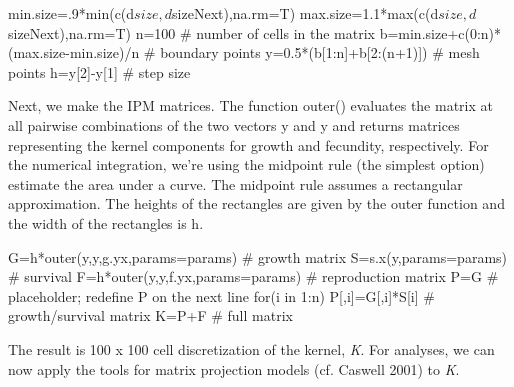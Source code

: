\documentclass[11pt]{article}
\begin{document}
\begin{Schunk}
\begin{Sinput}
 min.size=.9*min(c(d$size,d$sizeNext),na.rm=T)
 max.size=1.1*max(c(d$size,d$sizeNext),na.rm=T)
 n=100 # number of cells in the matrix
 b=min.size+c(0:n)*(max.size-min.size)/n # boundary points  
 y=0.5*(b[1:n]+b[2:(n+1)]) # mesh points
 h=y[2]-y[1] # step size
\end{Sinput}
\end{Schunk}

Next, we make the IPM matrices. The function outer() evaluates the matrix at all pairwise combinations of the two vectors y and y and returns matrices representing the kernel components for growth and fecundity, respectively. For the numerical integration, we're using the midpoint rule (the simplest option) estimate the area under a curve. The midpoint rule assumes a rectangular approximation. The heights of the rectangles are given by the outer function and the width of the rectangles is h. 
\begin{Schunk}
\begin{Sinput}
 G=h*outer(y,y,g.yx,params=params) # growth matrix
 S=s.x(y,params=params)            # survival 
 F=h*outer(y,y,f.yx,params=params) # reproduction matrix
 P=G                               # placeholder; redefine P on the next line
 for(i in 1:n) P[,i]=G[,i]*S[i]    # growth/survival matrix
 K=P+F                             # full matrix
\end{Sinput}
\end{Schunk}

The result is 100 x 100 cell discretization of the kernel, \emph{K}. For analyses, we can now apply the tools for matrix projection models (cf. Caswell 2001) to \emph{K}.
\end{document}
